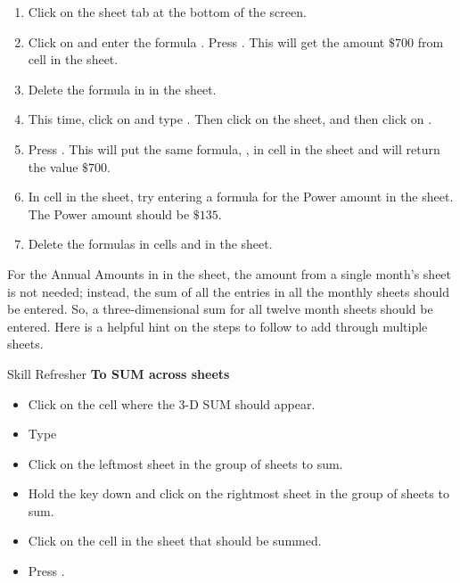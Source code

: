 \begin{enumerate}
	\item Click on the  sheet tab at the bottom of the screen.
	\item Click on  and enter the formula . Press . This will get the amount $ \$700 $ from cell  in the  sheet.
	\item Delete the formula in  in the  sheet.
	\item This time, click on  and type \fmtTyping{=}. Then click on the  sheet, and then click on .
	\item Press . This will put the same formula, , in cell  in the  sheet and will return the value $ \$700 $.
	\item In cell  in the  sheet, try entering a formula for the Power amount in the  sheet. The Power amount should be $ \$135 $.
	\item Delete the formulas in cells  and  in the  sheet.
\end{enumerate}

For the Annual Amounts in  in the  sheet, the amount from a single month's sheet is not needed; instead, the sum of all the entries in all the monthly sheets should be entered. So, a three-dimensional sum for all twelve month sheets should be entered. Here is a helpful hint on the steps to follow to add through multiple sheets.

\begin{center}
	\begin{sklbox}{Skill Refresher}
		\textbf{To SUM across sheets}
		\\
		\begin{itemize}
			\setlength{\itemsep}{0pt}
			\setlength{\parskip}{0pt}
			\setlength{\parsep}{0pt}
			
			\item Click on the cell where the 3-D SUM should appear.
			\item Type 
			\item Click on the leftmost sheet in the group of sheets to sum.
			\item Hold the  key down and click on the rightmost sheet in the group of sheets to sum.
			\item Click on the cell in the sheet that should be summed.
			\item Press .
			
		\end{itemize}
	\end{sklbox}
\end{center}


